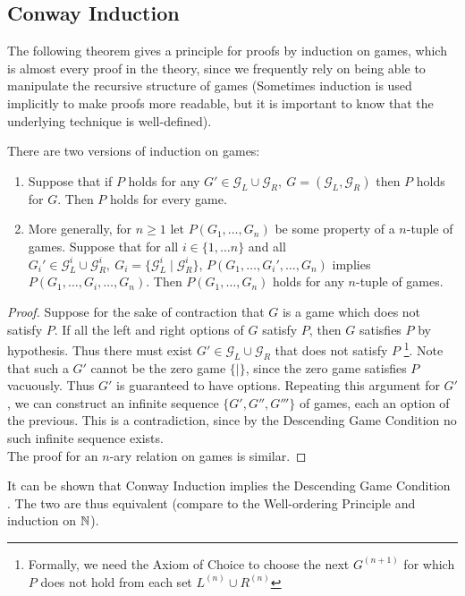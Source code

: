 \documentclass[../math194_paper.tex]{subfiles}
\begin{document}
\subsection{Conway Induction}

The following theorem gives a principle for proofs by induction on games, which 
is almost every proof in the theory, since we frequently rely on being able 
to manipulate the recursive structure of games (Sometimes induction is used implicitly 
to make proofs more readable, but it is important to know that the underlying technique 
is well-defined).

\begin{theorem} There are two versions of induction on games:
\label{induction}
\begin{enumerate}
    \item Suppose that if $P$ holds for any $G' \in \mathcal{G}_L \cup \mathcal{G}_R, \: 
    G = (\mathcal{G}_L, \mathcal{G}_R)$ then $P$ holds for $G$.  
    Then $P$ holds for every game.
    \item More generally, for $n \geq 1$ let $P(G_1, \ldots, G_n)$ be some property of a $n$-tuple of games.  Suppose 
    that for all $i \in \{1, \ldots n\}$ and all $G_i' \in \mathcal{G}_L^i \cup \mathcal{G}_R^i, \: 
    G_i = \{\mathcal{G}_L^i \mid \mathcal{G}_R^i\}$,
    $P(G_1, \ldots, G_i', \ldots, G_n)$ implies $P(G_1, \ldots, G_i, \ldots, G_n)$. 
    Then $P(G_1, \ldots, G_n)$ holds for any $n$-tuple  of games.
\end{enumerate}
\end{theorem}

\begin{proof}
    Suppose for the sake of contraction that $G$ is a game which does not satisfy $P$. 
    If all the left and right options of $G$ satisfy $P$, then $G$ satisfies $P$ by hypothesis.
    Thus there must exist $G' \in \mathcal{G}_L \cup \mathcal{G}_R$ that does not satisfy $P$ 
    \footnote{Formally, we need 
    the Axiom of Choice to choose the next $G^{(n+1)}$ for which $P$ does not hold from each set 
    $L^{(n)} \cup R^{(n)}$}. Note that such a $G'$ cannot be the zero game $\{ \mid \}$, since the
    zero game satisfies $P$ vacuously. Thus $G'$ is guaranteed to have options.
    Repeating this argument for $G'$, we can construct an infinite sequence $\{G', G'', G''' \}$ of games,
    each an option of the previous. This is a contradiction, since by the Descending Game Condition 
    no such infinite sequence exists. \\
    The proof for an $n$-ary relation on games is similar. 
\end{proof}
It can be shown that Conway Induction implies the Descending Game Condition \cite{schleicher2006introduction}.
The two are thus equivalent (compare to the Well-ordering Principle and induction on $\mathbb{N}$).
\end{document}
